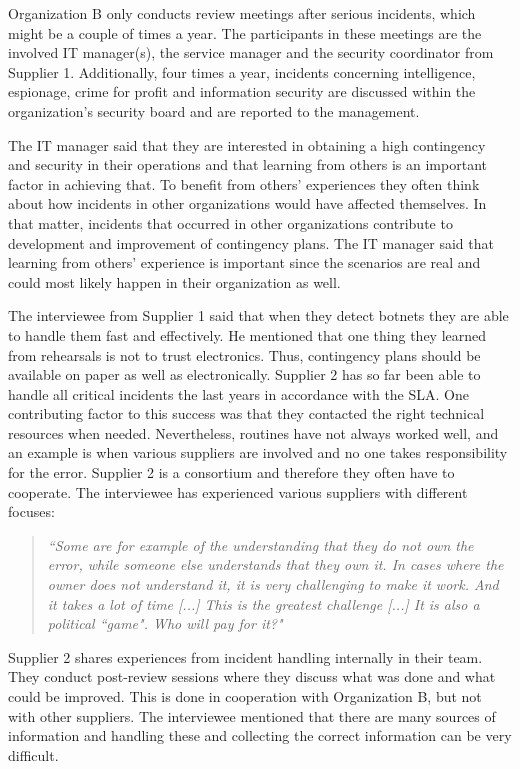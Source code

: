 Organization B only conducts review meetings after serious incidents, which might be a couple of times a year. The participants in these meetings are the involved IT manager(s), the service manager and the security coordinator from Supplier 1. Additionally, four times a year, incidents concerning intelligence, espionage, crime for profit and information security are discussed within the organization's security board and are reported to the management. 

The IT manager said that they are interested in obtaining a high contingency and security in their operations and that learning from others is an important factor in achieving that. To benefit from others' experiences they often think about how incidents in other organizations would have affected themselves. In that matter, incidents that occurred in other organizations contribute to development and improvement of contingency plans. The IT manager said that learning from others' experience is important since the scenarios are real and could most likely happen in their organization as well.

The interviewee from Supplier 1 said that when they detect botnets they are able to handle them fast and effectively. He mentioned that one thing they learned from rehearsals is not to trust electronics. Thus, contingency plans should be available on paper as well as electronically. Supplier 2 has so far been able to handle all critical incidents the last years in accordance with the \ac{SLA}. One contributing factor to this success was that they contacted the right technical resources when needed. Nevertheless, routines have not always worked well, and an example is when various suppliers are involved and no one takes responsibility for the error. Supplier 2 is a consortium and therefore they often have to cooperate. The interviewee has experienced various suppliers with different focuses:

\begin{quote}
\textit{``Some are for example of the understanding that they do not own the error, while someone else understands that they own it. In cases where the owner does not understand it, it is very challenging to make it work. And it takes a lot of time [...] This is the greatest challenge [...] It is also a political ``game". Who will pay for it?"}
\end{quote}

Supplier 2 shares experiences from incident handling internally in their team. They conduct post-review sessions where they discuss what was done and what could be improved. This is done in cooperation with Organization B, but not with other suppliers. The interviewee mentioned that there are many sources of information and handling these and collecting the correct information can be very difficult.

